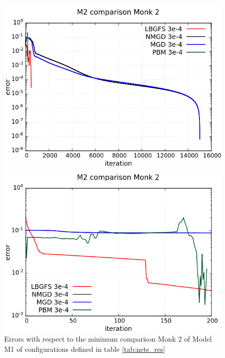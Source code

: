 \begin{figure}[H]
	\centering
	\begin{minipage}[t]{0.5\linewidth}
		\includegraphics[width=\linewidth]{data/Comparison/Monk2/Monk2_M2_error_standard.png}
	\end{minipage}%
	\begin{minipage}[t]{0.5\linewidth}
		\includegraphics[width=\linewidth]{data/Comparison/Monk2/Monk2_M2_error_zoom.png}
	\end{minipage}
	\caption{Errors with respect to the minimum comparison Monk 2 of Model M1 of configurations defined in table \ref{tab:nets_res}}
	\label{R-Monk2-M2}
\end{figure}
